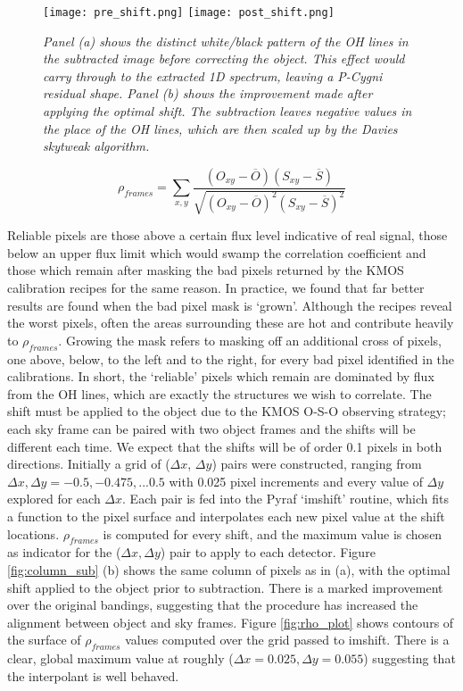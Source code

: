 \documentclass{literature}
\begin{document}
\begin{figure}[!htp]
\centering
\texttt{[image: pre\_shift.png]}
\texttt{[image: post\_shift.png]}
\caption{\footnotesize{\emph{Panel (a) shows the distinct white/black pattern of the OH lines in the subtracted image before correcting the object. This effect would carry through to the extracted 1D spectrum, leaving a P-Cygni residual shape. Panel (b) shows the improvement made after applying the optimal shift. The subtraction leaves negative values in the place of the OH lines, which are then scaled up by the Davies skytweak algorithm.}}}
\label{fig:pre_shift}
\end{figure}   

\begin{equation}
	\label{rho_frames}
	\rho_{frames} = \sum\limits_{x,y} \frac{(O_{xy} - \overline{O})(S_{xy} - \overline{S})}{\sqrt{(O_{xy} - \overline{O})^{2}(S_{xy} - \overline{S})^{2}}}
\end{equation}



Reliable pixels are those above a certain flux level indicative of real signal, those below an upper flux limit which would swamp the correlation coefficient and those which remain after masking the bad pixels returned by the KMOS calibration recipes for the same reason. In practice, we found that far better results are found when the bad pixel mask is `grown'. Although the recipes reveal the worst pixels, often the areas surrounding these are hot and contribute heavily to $\rho_{frames}$. Growing the mask refers to masking off an additional cross of pixels, one above, below, to the left and to the right, for every bad pixel identified in the calibrations. In short, the `reliable' pixels which remain are dominated by flux from the OH lines, which are exactly the structures we wish to correlate. The shift must be applied to the object due to the KMOS O-S-O observing strategy; each sky frame can be paired with two object frames and the shifts will be different each time. We expect that the shifts will be of order 0.1 pixels in both directions. Initially a grid of ($\Delta x$, $\Delta y$) pairs were constructed, ranging from $\Delta x, \Delta y = -0.5,-0.475,...0.5$ with 0.025 pixel increments and every value of $\Delta y$ explored for each $\Delta x$. Each pair is fed into the Pyraf `imshift' routine, which fits a function to the pixel surface and interpolates each new pixel value at the shift locations. $\rho _{frames}$ is computed for every shift, and the maximum value is chosen as indicator for the ($\Delta x, \Delta y$) pair to apply to each detector. Figure \ref{fig:column_sub} (b) shows the same column of pixels as in (a), with the optimal shift applied to the object prior to subtraction. There is a marked improvement over the original bandings, suggesting that the procedure has increased the alignment between object and sky frames. Figure \ref{fig:rho_plot} shows contours of the surface of $\rho _{frames}$ values computed over the grid passed to imshift. There is a clear, global maximum value at roughly ($\Delta x = 0.025, \Delta y = 0.055$) suggesting that the interpolant is well behaved. \\
\end{document}

